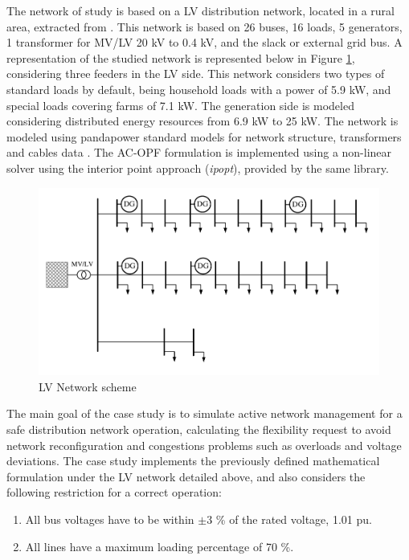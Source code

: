 The network of study is based on a LV distribution network, located in a rural area, extracted from \cite{Linder2014}. This network is based on 26 buses, 16 loads, 5 generators, 1 transformer for MV/LV 20 kV to 0.4 kV, and the slack or external grid bus. A representation of the studied network is represented below in Figure \ref{fig:case_study_LV}, considering three feeders in the LV side. 
This network considers two types of standard loads by default, being household loads with a power of 5.9 kW, and special loads covering farms of 7.1 kW. The generation side is modeled considering distributed energy resources from 6.9 kW to 25 kW. The network is modeled using pandapower standard models for network structure, transformers and cables data \cite{Thurner_2018}. The AC-OPF formulation is implemented using a non-linear solver using the interior point approach (\textit{ipopt}), provided by the same library. 
\vspace{10mm}
\begin{figure}[htbp]
	\centering
	\includegraphics[width=1\columnwidth ]{ChapterOPF_DSO/Figures/LV_network_2.pdf}
		\caption{LV Network scheme}
	\label{fig:case_study_LV}  
\end{figure}

The main goal of the case study is to simulate active network management for a safe distribution network operation, calculating the flexibility request to avoid network reconfiguration and congestions problems such as overloads and voltage deviations. The case study implements the previously defined mathematical formulation under the LV network detailed above, and also considers the following restriction for a correct operation: 

\begin{enumerate}
\item All bus voltages have to be within $\pm 3$ \% of the rated voltage, 1.01 pu.
\item All lines have a maximum loading percentage of 70 \%. 
\end{enumerate}

